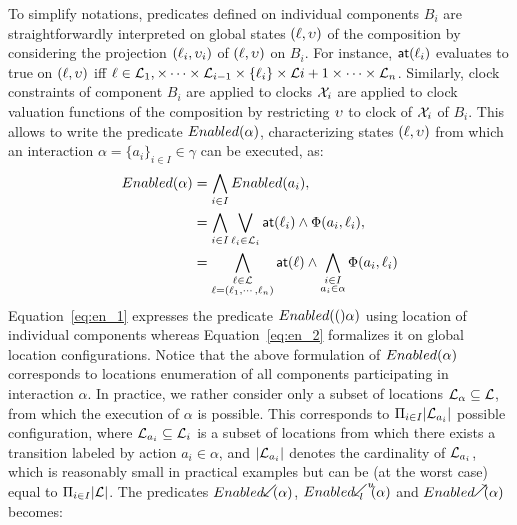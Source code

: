To simplify notations, predicates defined on individual components $B_i$ are
straightforwardly interpreted on global states $(\ell,\upsilon)$ of the composition
by considering the projection $(\ell_i,\upsilon_i)$ of $(\ell,\upsilon)$ on $B_i$.
For instance, $\textsf{at}(\ell_i)$ evaluates to true on $(\ell,\upsilon)$ iff
$\ell\in\mathcal{L}_1,\times\cdots\times\mathcal{L}_{i-1}\times\{\ell_i\}\times\mathcal{L}{i+1}\times
\cdots\times\mathcal{L}_n$. Similarly, clock constraints of component $B_i$ are applied
to clocks $\mathcal{X}_i$ are applied to clock valuation functions of the composition
by restricting $\upsilon$ to clock of $\mathcal{X}_i$ of $B_i$. This allows to write
the predicate $Enabled(\alpha)$, characterizing states $(\ell,\upsilon)$ from which 
an interaction $\alpha=\{a_i\}_{i\in{I}}\in\gamma$ can be executed, as:
\begin{align}\label{eq:en}
  Enabled(\alpha)&=\bigwedge_{i\in{I}}Enabled(a_i),\\
                  &=\bigwedge_{i\in{I}}\bigvee_{\ell_i\in\mathcal{L}_i}\textsf{at}(\ell_i)\wedge
                  \Phi(a_i,\ell_i),\label{eq:en_1}\\
                  &=\bigwedge_{\substack{\ell\in\mathcal{L}\\ 
                  \ell=(\ell_1,\cdots,\ell_n)}}\textsf{at}(\ell)\wedge
                  \bigwedge_{\substack{i\in I\\ a_i\in\alpha }}\Phi(a_i,\ell_i)\label{eq:en_2}
\end{align}
Equation~\ref{eq:en_1} expresses the predicate $Enabled(()\alpha)$ using location of individual
components whereas Equation~\ref{eq:en_2} formalizes it on global location configurations.
Notice that the above formulation of $Enabled(\alpha)$ corresponds to locations 
enumeration of all components participating in interaction $\alpha$. In practice,
we rather consider only a subset of locations $\mathcal{L}_{\alpha}\subseteq\mathcal{L}$, from
which the execution of $\alpha$ is possible. This corresponds to $\Pi_{i\in{I}}
|\mathcal{L}_{a_i}|$ possible configuration, where $\mathcal{L}_{a_i}\subseteq\mathcal{L}_i$ is a subset
of locations from which there exists a transition labeled by action $a_i\in\alpha$,
and $|\mathcal{L}_{a_i}|$ denotes the cardinality of $\mathcal{L}_{a_i}$, which is reasonably
small in practical examples but can be (at the worst case) equal to $\Pi_{i\in{I}}
|\mathcal{L}|$. The predicates $\enabledbackward{\alpha}$, 
$\enabledbackwardb{\alpha}{l}{u}$ and $\enabledforward{\alpha}$ becomes:


